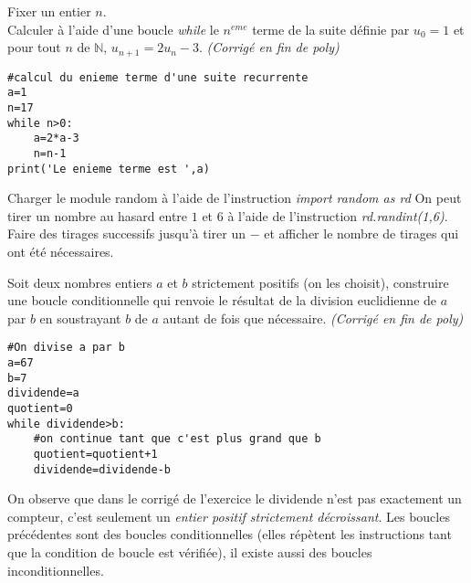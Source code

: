 \begin{Exercise}[title={Construire une boucle conditionnelle},counter={exo}]
\label{exorec}
Fixer un entier $n$.\\
Calculer à l'aide d'une boucle \textit{while} le $n^{eme}$ terme de la suite définie par $u_0=1$ et pour tout $n$ de $\mathbb{N}$, $u_{n+1}=2u_n-3$. \textit{(Corrigé en fin de poly)}
\end{Exercise}

\begin{Answer}
\begin{lstlisting}[frame=lines, caption={$n^{eme}$ terme}]
#calcul du enieme terme d'une suite recurrente
a=1
n=17
while n>0:
	a=2*a-3
	n=n-1
print('Le enieme terme est ',a)  
\end{lstlisting} 
\end{Answer}

\begin{Exercise}[title={Première apparition},counter={exo}]
Charger le module random à l'aide de l'instruction \textit{import random as rd} On peut tirer un nombre au hasard entre $1$ et $6$ à l'aide de l'instruction \textit{rd.randint(1,6)}. Faire des tirages successifs jusqu'à tirer un $-$ et afficher le nombre de tirages qui ont été nécessaires. 
\end{Exercise}

\begin{Exercise}[title={Construire une boucle conditionnelle sans utiliser de compteur: division naïve},counter={exo}]
\label{exonaif}
  Soit deux nombres entiers $a$ et $b$ strictement positifs (on les choisit), construire une boucle conditionnelle qui renvoie le résultat de la division euclidienne de $a$ par $b$ en soustrayant $b$ de $a$ autant de fois que nécessaire. \textit{(Corrigé en fin de poly)}
\end{Exercise}

\begin{Answer}
\begin{lstlisting}[frame=lines, caption={division naïve}, label=premcode4]
#On divise a par b
a=67
b=7
dividende=a
quotient=0
while dividende>b:
    #on continue tant que c'est plus grand que b 
    quotient=quotient+1
    dividende=dividende-b
\end{lstlisting} 
\end{Answer}

On observe que dans le corrigé de l'exercice \label{exonaif} le dividende n'est pas exactement un compteur, c'est seulement un \emph{entier positif strictement décroissant}. Les boucles précédentes sont des boucles conditionnelles (elles répètent les instructions tant que la condition de boucle est vérifiée), il existe aussi des boucles inconditionnelles.

